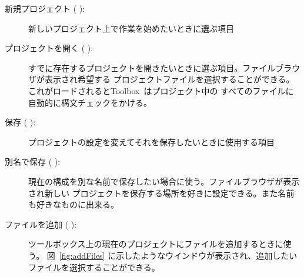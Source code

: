 \documentclass[\pformat,12pt]{jarticle}
\newcommand{\Toolbox}{Toolbox}
\newcommand{\guicmd}[1]{{\gt #1}}
\begin{document}
\begin{description}


\item[\guicmd{新規プロジェクト} (\hspace{-1.8mm}
):]
  新しいプロジェクト上で作業を始めたいときに選ぶ項目

\item[\guicmd{プロジェクトを開く} (\hspace{-1.2mm}
\hspace{.6mm}):]
  すでに存在するプロジェクトを開きたいときに選ぶ項目。ファイルブラウザが表示され希望する
  プロジェクトファイルを選択することができる。これがロードされると\Toolbox\ はプロジェクト中の
  すべてのファイルに自動的に構文チェックをかける。

\item[\guicmd{保存} (\hspace{-1.8mm}
):]
  プロジェクトの設定を変えてそれを保存したいときに使用する項目

\item[\guicmd{別名で保存} (\hspace{-1.5mm}
):]
  現在の構成を別な名前で保存したい場合に使う。ファイルブラウザが表示され新しい
  プロジェクトを保存する場所を好きに設定できる。また名前も好きなものに出来る。

\item[\guicmd{ファイルを追加} (\hspace{-1.5mm}
):] 
  ツールボックス上の現在のプロジェクトにファイルを追加するときに使う。
  図~\ref{fig:addFiles} に示したようなウインドウが表示され、追加したいファイルを選択することができる。


\end{description}
\end{document}
